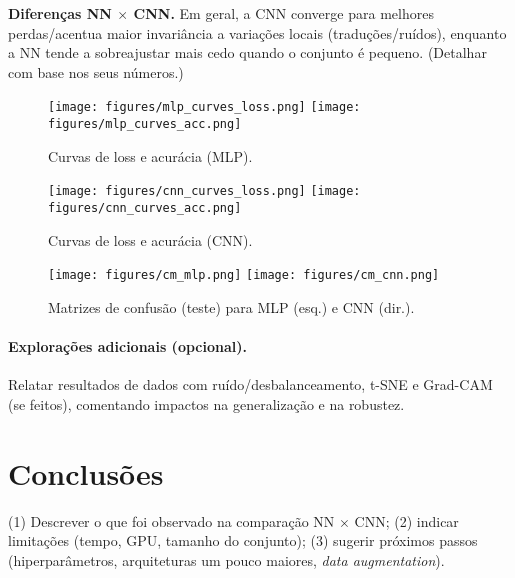 \documentclass[11pt,a4paper]{article}
\begin{document}
\noindent \textbf{Diferenças NN $\times$ CNN.} Em geral, a CNN converge para melhores perdas/acentua maior invariância a variações locais (traduções/ruídos), enquanto a NN tende a sobreajustar mais cedo quando o conjunto é pequeno. (Detalhar com base nos seus números.)

\begin{figure}[h]
  \centering
  \texttt{[image: figures/mlp\_curves\_loss.png]}
  \texttt{[image: figures/mlp\_curves\_acc.png]}
  \caption{Curvas de loss e acurácia (MLP).}
  \label{fig:mlp_curves}
\end{figure}

\begin{figure}[h]
  \centering
  \texttt{[image: figures/cnn\_curves\_loss.png]}
  \texttt{[image: figures/cnn\_curves\_acc.png]}
  \caption{Curvas de loss e acurácia (CNN).}
  \label{fig:cnn_curves}
\end{figure}

\begin{figure}[h]
  \centering
  \texttt{[image: figures/cm\_mlp.png]}
  \texttt{[image: figures/cm\_cnn.png]}
  \caption{Matrizes de confusão (teste) para MLP (esq.) e CNN (dir.).}
  \label{fig:cm_mlp}\label{fig:cm_cnn}
\end{figure}

\paragraph{Explorações adicionais (opcional).}
Relatar resultados de dados com ruído/desbalanceamento, t-SNE e Grad-CAM (se feitos), comentando impactos na generalização e na robustez.

\section*{Conclusões}
(1) Descrever o que foi observado na comparação NN $\times$ CNN; (2) indicar limitações (tempo, GPU, tamanho do conjunto); (3) sugerir próximos passos (hiperparâmetros, arquiteturas um pouco maiores, \emph{data augmentation}).
\end{document}
